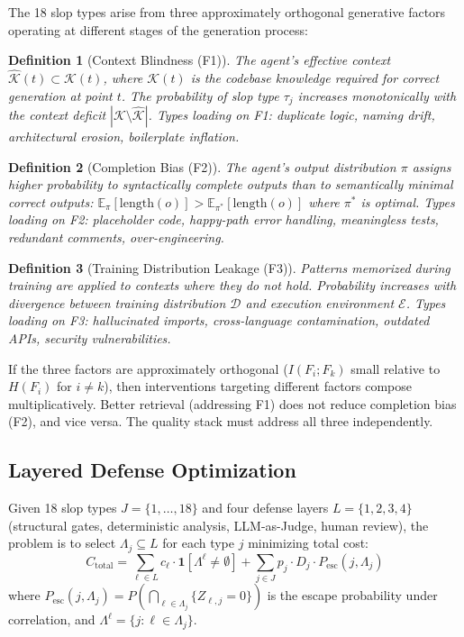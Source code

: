 \documentclass[11pt, a4paper, logo, copyright]{googledeepmind}
\newtheorem{definition}{Definition}[section]
\begin{document}
The 18 slop types arise from three approximately orthogonal generative factors operating at different stages of the generation process:

\begin{definition}[Context Blindness (F1)]
The agent's effective context $\hat{\mathcal{K}}(t) \subset \mathcal{K}(t)$, where $\mathcal{K}(t)$ is the codebase knowledge required for correct generation at point $t$. The probability of slop type $\tau_j$ increases monotonically with the context deficit $|\mathcal{K} \setminus \hat{\mathcal{K}}|$. Types loading on F1: duplicate logic, naming drift, architectural erosion, boilerplate inflation.
\end{definition}

\begin{definition}[Completion Bias (F2)]
The agent's output distribution $\pi$ assigns higher probability to syntactically complete outputs than to semantically minimal correct outputs: $\mathbb{E}_\pi[\mathrm{length}(o)] > \mathbb{E}_{\pi^*}[\mathrm{length}(o)]$ where $\pi^*$ is optimal. Types loading on F2: placeholder code, happy-path error handling, meaningless tests, redundant comments, over-engineering.
\end{definition}

\begin{definition}[Training Distribution Leakage (F3)]
Patterns memorized during training are applied to contexts where they do not hold. Probability increases with divergence between training distribution $\mathcal{D}$ and execution environment $\mathcal{E}$. Types loading on F3: hallucinated imports, cross-language contamination, outdated APIs, security vulnerabilities.
\end{definition}

If the three factors are approximately orthogonal ($I(F_i; F_k)$ small relative to $H(F_i)$ for $i \neq k$), then interventions targeting different factors compose multiplicatively. Better retrieval (addressing F1) does not reduce completion bias (F2), and vice versa. The quality stack must address all three independently.

\subsection{Layered Defense Optimization}

Given 18 slop types $J = \{1, \ldots, 18\}$ and four defense layers $L = \{1, 2, 3, 4\}$ (structural gates, deterministic analysis, LLM-as-Judge, human review), the problem is to select $\Lambda_j \subseteq L$ for each type $j$ minimizing total cost:
\begin{equation}
C_{\mathrm{total}} = \sum_{\ell \in L} c_\ell \cdot \mathbf{1}[\Lambda^\ell \neq \emptyset] + \sum_{j \in J} p_j \cdot D_j \cdot P_{\mathrm{esc}}(j, \Lambda_j)
\end{equation}
where $P_{\mathrm{esc}}(j, \Lambda_j) = P(\bigcap_{\ell \in \Lambda_j} \{Z_{\ell,j} = 0\})$ is the escape probability under correlation, and $\Lambda^\ell = \{j : \ell \in \Lambda_j\}$.
\end{document}
